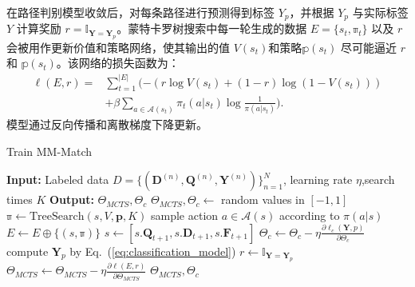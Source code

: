 在路径判别模型收敛后，对每条路径进行预测得到标签 $Y_p$，并根据 $Y_p$ 与实际标签 $Y$ 计算奖励 $r= \mathbb{I}_{\mathbf{Y} = \mathbf{Y}_p}$。蒙特卡罗树搜索中每一轮生成的数据 $E=\{s_t, \mathbb{\pi}_t\}$ 以及 $r$ 会被用作更新价值和策略网络，使其输出的值 $V(s_t)$和策略$\mathbb{p}(s_t)$ 尽可能逼近 $r$ 和 $\mathbb{p}(s_t)$。该网络的损失函数为：
\begin{equation}
\label{eq:loss}
\begin{aligned}
  \ell(E, r) = &\sum_{t=1}^{|E|} (-(r\log V(s_t) + (1-r)\log (1-V(s_t)))  \\
  &+ \beta\sum_{a\in\mathcal{A}(s_t)}\pi_t(a|s_t) \log \frac{1}{\pi(a|s_t)}).
\end{aligned}
\end{equation}
模型通过反向传播和离散梯度下降更新。

\begin{algorithm}[!htbp]
\caption{Train MM-Match}\label{alg:Train}

\begin{algorithmic}[1]
\STATE \textbf{Input:} Labeled data $D=\{ (\mathbf{D}^{(n)}, \mathbf{Q}^{(n)}, \mathbf{Y}^{(n)})\}_{n=1}^N$, learning rate $\eta$,search times $K$
\STATE \textbf{Output:} $\Theta_{MCTS}, \Theta_{c}$
\STATE {} $\Theta_{MCTS}, \Theta_{c} \leftarrow$ random values in $[-1, 1]$
\REPEAT
            \STATE $\mathbb{\pi} \leftarrow \mathrm{TreeSearch}(s, V, \mathbf{p}, K)$ 
      \STATE sample action ${a\in\mathcal{A}(s)}$ according to $\pi(a|s)$
      \STATE $E\leftarrow E \oplus \{(s, \mathbb{\pi})\}$
      \STATE $s \leftarrow [s.\mathbf{Q}_{t+1}, s.\mathbf{D}_{t+1}, s.\mathbf{F}_{t+1}]$
    \ENDWHILE
    \STATE $\Theta_{c} \leftarrow \Theta_{c} - \eta \frac{\partial \ell_c(\mathbf{Y}, p)}{\partial \Theta_{c}}$  
    \ENDWHILE
    \STATE compute $\mathbf{Y}_p$ by Eq.~(\ref{eq:classification_model})
    \STATE $r \leftarrow \mathbb{I}_{\mathbf{Y} = \mathbf{Y}_p}$
    \STATE $\Theta_{MCTS} \leftarrow \Theta_{MCTS} -\eta \frac{\partial \ell(E, r)}{\partial \Theta_{MCTS}}$ 
  \ENDFOR
{}
\STATE\RETURN $\Theta_{MCTS}, \Theta_{c}$
\end{algorithmic}
\end{algorithm}


